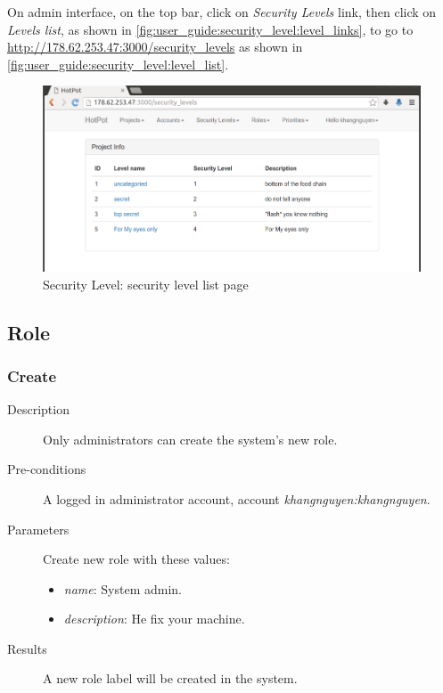 On admin interface, on the top bar, click on \emph{Security Levels} link, then click on \emph{Levels list}, as shown in \autoref{fig:user_guide:security_level:level_links}, 
to go to \href{http://178.62.253.47:3000/security\_levels}{http://178.62.253.47:3000/security\_levels} as shown in \autoref{fig:user_guide:security_level:level_list}.

\begin{figure}[bth]
\myfloatalign
\includegraphics[width=1.0\linewidth]{gfx/chapter_5/security_level/level_list}
\caption[Security Level: security level list page]{Security Level: security level list page}
\label{fig:user_guide:security_level:level_list}
\end{figure}

\subsection{Role}
\label{ch:result:user_guide:role}
\subsubsection{Create}
\label{ch:result:user_guide:role:create}

\begin{description}
\item[Description] Only administrators can create the system's new role.
\item[Pre-conditions] A logged in administrator account, \eg account \emph{khangnguyen:khangnguyen}.
\item[Parameters] Create new role with these values:
\begin{itemize}
\item \emph{name}: System admin.
\item \emph{description}: He fix your machine.
\end{itemize}
\item[Results] A new role label will be created in the system.
\end{description}

